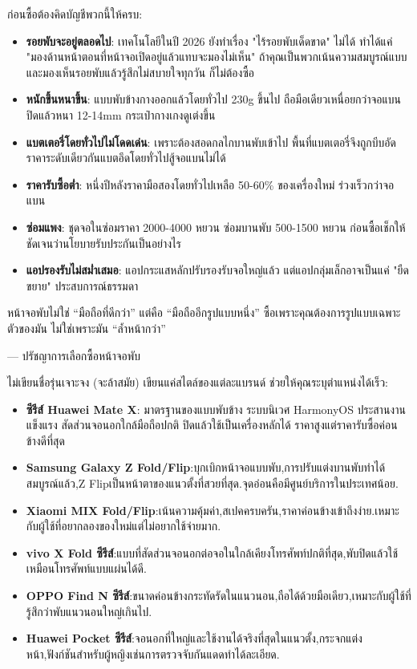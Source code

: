 
ก่อนซื้อต้องคิดบัญชีพวกนี้ให้ครบ:

\begin{itemize}
  \item \textbf{รอยพับจะอยู่ตลอดไป}: เทคโนโลยีในปี 2026 ยังทำเรื่อง "ไร้รอยพับเด็ดขาด" ไม่ได้ ทำได้แค่ "มองด้านหน้าตอนที่หน้าจอเปิดอยู่แล้วแทบจะมองไม่เห็น" ถ้าคุณเป็นพวกเน้นความสมบูรณ์แบบ และมองเห็นรอยพับแล้วรู้สึกไม่สบายใจทุกวัน ก็ไม่ต้องซื้อ
  \item \textbf{หนักขึ้นหนาขึ้น}: แบบพับข้างกางออกแล้วโดยทั่วไป 230g ขึ้นไป ถือมือเดียวเหนื่อยกว่าจอแบน ปิดแล้วหนา 12-14mm กระเป๋ากางเกงดูเต่งขึ้น
  \item \textbf{แบตเตอรี่โดยทั่วไปไม่โดดเด่น}: เพราะต้องสอดกลไกบานพับเข้าไป พื้นที่แบตเตอรี่จึงถูกบีบอัด ราคาระดับเดียวกันแบตอึดโดยทั่วไปสู้จอแบนไม่ได้
  \item \textbf{ราคารับซื้อต่ำ}: หนึ่งปีหลังราคามือสองโดยทั่วไปเหลือ 50-60\% ของเครื่องใหม่ ร่วงเร็วกว่าจอแบน
  \item \textbf{ซ่อมแพง}: ชุดจอในซ่อมราคา 2000-4000 หยวน ซ่อมบานพับ 500-1500 หยวน ก่อนซื้อเช็กให้ชัดเจนว่านโยบายรับประกันเป็นอย่างไร
  \item \textbf{แอปรองรับไม่สม่ำเสมอ}: แอปกระแสหลักปรับรองรับจอใหญ่แล้ว แต่แอปกลุ่มเล็กอาจเป็นแค่ "ยืดขยาย" ประสบการณ์ธรรมดา
\end{itemize}

หน้าจอพับไม่ใช่ “มือถือที่ดีกว่า” แต่คือ “มือถืออีกรูปแบบหนึ่ง” ซื้อเพราะคุณต้องการรูปแบบเฉพาะตัวของมัน ไม่ใช่เพราะมัน “ล้ำหน้ากว่า”

— ปรัชญาการเลือกซื้อหน้าจอพับ


ไม่เขียนชื่อรุ่นเจาะจง (จะล้าสมัย) เขียนแค่สไตล์ของแต่ละแบรนด์ ช่วยให้คุณระบุตำแหน่งได้เร็ว:

\begin{itemize}
  \item \textbf{ซีรีส์ Huawei Mate X}: มาตรฐานของแบบพับข้าง ระบบนิเวศ HarmonyOS ประสานงานแข็งแรง สัดส่วนจอนอกใกล้มือถือปกติ ปิดแล้วใช้เป็นเครื่องหลักได้ ราคาสูงแต่ราคารับซื้อค่อนข้างดีที่สุด
  \item \textbf{Samsung Galaxy Z Fold/Flip}:บุกเบิกหน้าจอแบบพับ,การปรับแต่งบานพับทำได้สมบูรณ์แล้ว,Z Flipเป็นหน้าตาของแนวตั้งที่สวยที่สุด.จุดอ่อนคือมีศูนย์บริการในประเทศน้อย.
  \item \textbf{Xiaomi MIX Fold/Flip}:เน้นความคุ้มค่า,สเปคครบครัน,ราคาค่อนข้างเข้าถึงง่าย.เหมาะกับผู้ใช้ที่อยากลองของใหม่แต่ไม่อยากใช้จ่ายมาก.
  \item \textbf{vivo X Fold ซีรีส์}:แบบที่สัดส่วนจอนอกต่อจอในใกล้เคียงโทรศัพท์ปกติที่สุด,พับปิดแล้วใช้เหมือนโทรศัพท์แบบแผ่นได้ดี.
  \item \textbf{OPPO Find N ซีรีส์}:ขนาดค่อนข้างกระทัดรัดในแนวนอน,ถือได้ด้วยมือเดียว,เหมาะกับผู้ใช้ที่รู้สึกว่าพับแนวนอนใหญ่เกินไป.
  \item \textbf{Huawei Pocket ซีรีส์}:จอนอกที่ใหญ่และใช้งานได้จริงที่สุดในแนวตั้ง,กระจกแต่งหน้า,ฟังก์ชันสำหรับผู้หญิงเช่นการตรวจจับกันแดดทำได้ละเอียด.
\end{itemize}

